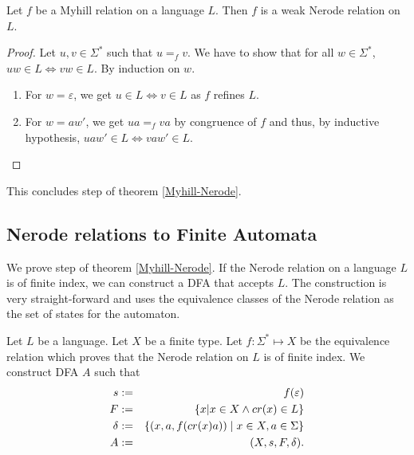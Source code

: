 \begin{theorem}
    \label{myhill_suffix}
    Let $f$ be a Myhill relation on a language $L$.
    Then $f$ is a weak Nerode relation on $L$.
\end{theorem}
\begin{proof}
    Let $u, v \in \Sigma^*$ such that $u =_f v$. We have to show that for all $w \in \Sigma^*$, $u w \in L \Leftrightarrow v w \in L$.
    By induction on $w$.
    \begin{enumerate}
        \item For $w = \varepsilon$, we get $u \in L \Leftrightarrow v \in L$ as $f$ refines $L$.
        \item For $w = aw'$, we get $ua =_f va$ by congruence of $f$ and thus, by inductive hypothesis, $uaw' \in L \Leftrightarrow vaw' \in L$.
    \end{enumerate}
\end{proof}



This concludes step  of theorem \ref{Myhill-Nerode}.

\subsection{Nerode relations to Finite Automata}
We prove step  of theorem \ref{Myhill-Nerode}. 
If the Nerode relation on a language $L$ is of finite index, we can construct a DFA that accepts $L$.
The construction is very straight-forward and uses the equivalence classes of the Nerode relation as the set of states for the automaton.

\begin{definition}
    \label{nerode_to_dfa} 
    Let $L$ be a language. Let $X$ be a finite type. Let $f: \Sigma^* \mapsto X$ be the equivalence relation which proves that the Nerode relation on $L$ is of finite index.
    We construct DFA $A$ such that
\begin{eqnarray*}
    s & := & f(\varepsilon) \\
    F & := & \{ x | x \in X \wedge cr(x) \in L \} \\
    \delta & := & \{ (x, a, f(cr(x) a)) \; | \; x \in X, a \in \Sigma \} \\
    A &:=&  (X, s, F, \delta).
\end{eqnarray*}
\end{definition}

